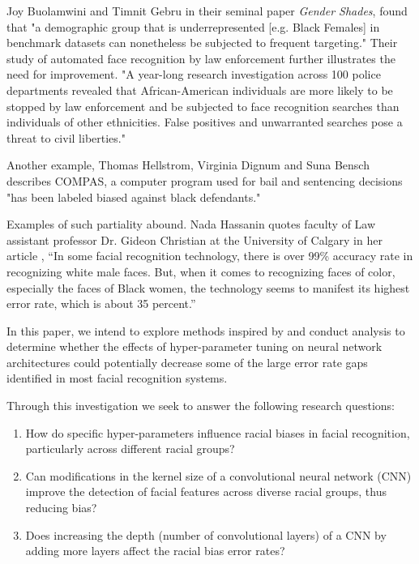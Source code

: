 \documentclass[conference]{IEEEtran}
\begin{document}
Joy Buolamwini and Timnit Gebru in their seminal paper \textit{Gender Shades}\cite{pmlr-v81-buolamwini18a}, found that "a demographic group that is underrepresented [e.g. Black Females] in benchmark datasets can nonetheless be subjected to frequent targeting." Their study of automated face recognition by law enforcement further illustrates the need for improvement. "A year-long research investigation across 100 police departments revealed that African-American individuals are more likely to be stopped by law enforcement and be subjected to face recognition searches than individuals of other ethnicities. False positives and unwarranted searches pose a threat to civil liberties."

Another example, Thomas Hellstrom, Virginia Dignum and Suna Bensch describes COMPAS, a computer program used for bail and sentencing decisions "has been labeled biased against black defendants\cite{hellstrom2020bias}."

Examples of such partiality abound. Nada Hassanin quotes faculty of Law assistant professor Dr. Gideon Christian at the University of Calgary in her article \cite{Hassanin_2023}, “In some facial recognition technology, there is over 99\% accuracy rate in recognizing white male faces. But, when it comes to recognizing faces of color, especially the faces of Black women, the technology seems to manifest its highest error rate, which is about 35 percent.”

In this paper, we intend to explore methods inspired by \cite{maze2018iarpa} and conduct analysis to determine whether the effects of hyper-parameter tuning on neural network architectures could potentially decrease some of the large error rate gaps identified in most facial recognition systems. 

Through this investigation we seek to answer the following research questions:
\begin{enumerate}
    \item How do specific hyper-parameters influence racial biases in facial recognition, particularly across different racial groups?
    \item Can modifications in the kernel size of a convolutional neural network (CNN) improve the detection of facial features across diverse racial groups, thus reducing bias?
    \item Does increasing the depth (number of convolutional layers) of a CNN by adding more layers affect the racial bias error rates?
\end{enumerate}
\end{document}
